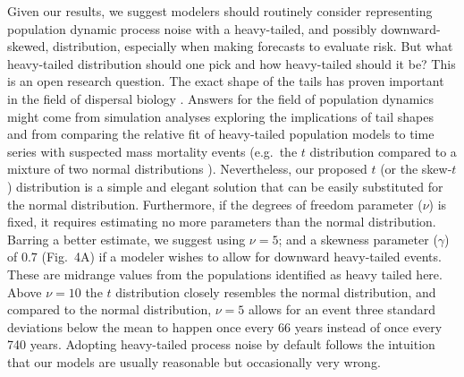 \documentclass[9pt,twocolumn,twoside]{pnas-new}
\begin{document}

Given our results, we suggest modelers should routinely consider representing population dynamic
process noise with a heavy-tailed, and possibly downward-skewed, distribution,
especially when making forecasts to evaluate risk.
But what heavy-tailed distribution should one pick
and how heavy-tailed should it be?
This is an open research question.
The exact shape of the tails has proven important
in the field of dispersal biology \cite{kot1996, clark1999}.
Answers for the field of population dynamics
might come from simulation analyses exploring
the implications of tail shapes and
from comparing the relative fit of heavy-tailed
population models to time series
with suspected mass mortality events
(e.g.~the $t$ distribution compared to a mixture
of two normal distributions \cite{ward2007}).
Nevertheless, our proposed $t$ (or the skew-$t$) distribution
is a simple and elegant solution that
can be easily substituted for the normal distribution.
Furthermore, if the degrees of freedom parameter ($\nu$)
is fixed,
it requires estimating no more parameters
than the normal distribution.
Barring a better estimate,
we suggest using $\nu = 5$; and
a skewness parameter ($\gamma$) of $0.7$ (Fig.~4A)
if a modeler wishes to allow for downward heavy-tailed events.
These are midrange values from the populations identified as heavy tailed here.
Above $\nu  =  10$ the $t$ distribution closely resembles
the normal distribution,
and compared to the normal distribution, $\nu  = 5$ allows for an event
three standard deviations below the mean to happen
once every 66 years instead of once every 740 years.
Adopting heavy-tailed process noise by default follows the intuition
that our models are usually reasonable but occasionally very wrong.
\end{document}
